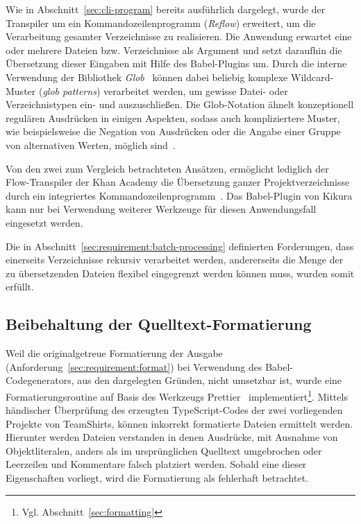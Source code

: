 Wie in Abschnitt~\ref{sec:cli-program} bereits ausführlich dargelegt, wurde der Transpiler um ein Kommandozeilenprogramm (\textit{Reflow}) erweitert, um die Verarbeitung gesamter Verzeichnisse zu realisieren. Die Anwendung erwartet eine oder mehrere Dateien bzw. Verzeichnisse als Argument und setzt daraufhin die Übersetzung dieser Eingaben mit Hilfe des Babel-Plugins um.
Durch die interne Verwendung der Bibliothek \textit{Glob}~\autocite{NPM:GLOB} können dabei beliebig komplexe Wildcard-Muster (\textit{glob patterns}) verarbeitet werden, um gewisse Datei- oder Verzeichnistypen ein- und auszuschließen. Die Glob-Notation ähnelt konzeptionell regulären Ausdrücken in einigen Aspekten, sodass auch kompliziertere Muster, wie beispielsweise die Negation von Ausdrücken oder die Angabe einer Gruppe von alternativen Werten, möglich sind~\autocite{MAN:GLOB}.

Von den zwei zum Vergleich betrachteten Ansätzen, ermöglicht lediglich der Flow-Transpiler der Khan Academy die Übersetzung ganzer Projektverzeichnisse durch ein integriertes Kommandozeilenprogramm~\autocite{KHAN:FLOW_TO_TS}. Das Babel-Plugin von Kikura kann nur bei Verwendung weiterer Werkzeuge für diesen Anwendungsfall eingesetzt werden.

Die in Abschnitt~\ref{sec:requirement:batch-processing} definierten Forderungen, dass einerseits Verzeichnisse rekursiv verarbeitet werden, andererseits die Menge der zu übersetzenden Dateien flexibel eingegrenzt werden können muss, wurden somit erfüllt.

\subsection{Beibehaltung der Quelltext-Formatierung}

Weil die originalgetreue Formatierung der Ausgabe (Anforderung~\ref{sec:requirement:format}) bei Verwendung des Babel-Codegenerators, aus den dargelegten Gründen, nicht umsetzbar ist, wurde eine Formatierungsroutine auf Basis des Werkzeugs Prettier~\autocite{SOFTWARE:PRETTIER} implementiert\footnote{Vgl. Abschnitt~\ref{sec:formatting}}.
Mittels händischer Überprüfung des erzeugten TypeScript-Codes der zwei vorliegenden Projekte von TeamShirts, können inkorrekt formatierte Dateien ermittelt werden. Hierunter werden Dateien verstanden in denen Ausdrücke, mit Ausnahme von Objektliteralen, anders als im ursprünglichen Quelltext umgebrochen oder Leerzeilen und Kommentare falsch platziert werden. Sobald eine dieser Eigenschaften vorliegt, wird die Formatierung als fehlerhaft betrachtet.

